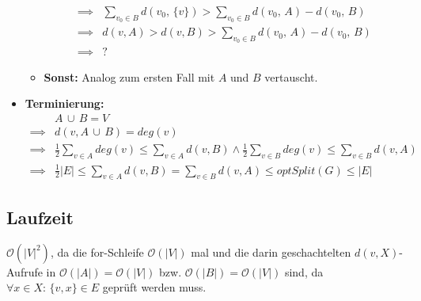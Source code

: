 \begin{itemize}
\begin{itemize}
\begin{align*}
					\implies & \sum_{v_0 \in B} d(v_0,\, \{ v \}) > \sum_{v_0 \in B} d(v_0,\, A) - d(v_0,\, B) \\
					\implies & d(v, A) > d(v, B) > \sum_{v_0 \in B} d(v_0,\, A) - d(v_0,\, B) \\
					\implies & ?
				\end{align*}
			\item \textbf{Sonst:} Analog zum ersten Fall mit $A$ und $B$ vertauscht.
		\end{itemize}
	\item \textbf{Terminierung:}
		\begin{align*}
			& A \, \cup \, B = V \\
			\implies & d(v, A \, \cup \, B) = deg(v) \\
			\implies & \frac{1}{2} \sum_{v \in A} deg(v) \le \sum_{v \in A} d(v, B) \land \frac{1}{2} \sum_{v \in B} deg(v) \le \sum_{v \in B} d(v, A) \\
			\implies & \frac{1}{2} |E| \le \sum_{v \in A} d(v, B) = \sum_{v \in B} d(v, A) \le optSplit(G) \le |E|
		\end{align*}
\end{itemize}

\subsection{Laufzeit}
\label{sub:Laufzeit}

$\mathcal{O}(|V|^2)$, da die for-Schleife $\mathcal{O}(|V|)$ mal und die darin geschachtelten $d(v, X)$-Aufrufe in $\mathcal{O}(|A|) = \mathcal{O}(|V|)$ bzw. $\mathcal{O}(|B|) = \mathcal{O}(|V|)$ sind, da $\forall x \in X:\, \{ v, x \} \in E$ geprüft werden muss.


